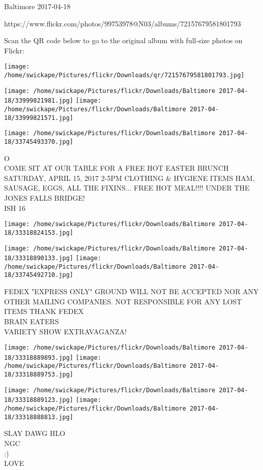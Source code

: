\documentclass[10pt,letterpaper]{article}
\begin{document}
Baltimore 2017-04-18

https://www.flickr.com/photos/99753978@N03/albums/72157679581801793

Scan the QR code below to go to the original album with full-size photos on Flickr:

\texttt{[image: /home/swickape/Pictures/flickr/Downloads/qr/72157679581801793.jpg]}
\pagebreak

\texttt{[image: /home/swickape/Pictures/flickr/Downloads/Baltimore 2017-04-18/33999821981.jpg]}
\texttt{[image: /home/swickape/Pictures/flickr/Downloads/Baltimore 2017-04-18/33999821571.jpg]}

\texttt{[image: /home/swickape/Pictures/flickr/Downloads/Baltimore 2017-04-18/33745493370.jpg]}

O\\
COME SIT AT OUR TABLE FOR A FREE HOT EASTER BRUNCH SATURDAY, APRIL 15, 2017 2{-}5PM CLOTHING \& HYGIENE ITEMS HAM, SAUSAGE, EGGS, ALL THE FIXINS... FREE HOT MEAL!!!! UNDER THE JONES FALLS BRIDGE!\\
ISH 16
\pagebreak

\texttt{[image: /home/swickape/Pictures/flickr/Downloads/Baltimore 2017-04-18/33318824153.jpg]}

\vspace{0.25in}
\texttt{[image: /home/swickape/Pictures/flickr/Downloads/Baltimore 2017-04-18/33318890133.jpg]}
\texttt{[image: /home/swickape/Pictures/flickr/Downloads/Baltimore 2017-04-18/33745492710.jpg]}

FEDEX "EXPRESS ONLY" GROUND WILL NOT BE ACCEPTED NOR ANY OTHER MAILING COMPANIES.  NOT RESPONSIBLE FOR ANY LOST ITEMS THANK FEDEX\\
BRAIN EATERS\\
VARIETY SHOW EXTRAVAGANZA!
\pagebreak

\texttt{[image: /home/swickape/Pictures/flickr/Downloads/Baltimore 2017-04-18/33318889893.jpg]}
\texttt{[image: /home/swickape/Pictures/flickr/Downloads/Baltimore 2017-04-18/33318889753.jpg]}

\texttt{[image: /home/swickape/Pictures/flickr/Downloads/Baltimore 2017-04-18/33318889123.jpg]}
\texttt{[image: /home/swickape/Pictures/flickr/Downloads/Baltimore 2017-04-18/33318888813.jpg]}

SLAY DAWG HLO\\
NGC\\
:)\\
LOVE
\pagebreak
\end{document}
